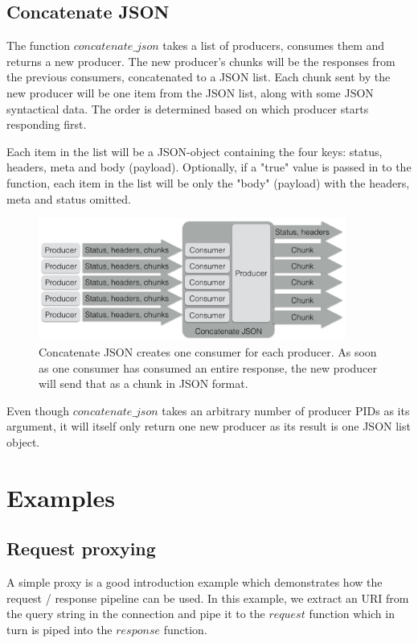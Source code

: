\documentclass{cslthse-msc}
\begin{document}
\subsection{Concatenate JSON}
The function $concatenate\_json$ takes a list of producers, consumes them and returns a new producer. The new producer's chunks will be the responses from the previous consumers, concatenated to a JSON list. Each chunk sent by the new producer will be one item from the JSON list, along with some JSON syntactical data. The order is determined based on which producer starts responding first.

Each item in the list will be a JSON-object containing the four keys: status, headers, meta and body (payload). Optionally, if a "true" value is passed in to the function, each item in the list will be only the "body" (payload) with the headers, meta and status omitted.


\begin{figure}[H]
  \centering
    \begin{center}
      \includegraphics[width=0.9\textwidth]{images/crocpear_concatenate_json.png}
    \end{center}
  \caption{Concatenate JSON creates one consumer for each producer. As soon as one consumer has consumed an entire response, the new producer will send that as a chunk in JSON format.}
\end{figure}

Even though $concatenate\_json$ takes an arbitrary number of producer PIDs as its argument, it will itself only return one new producer as its result is one JSON list object.

\section{Examples}
\subsection{Request proxying}
A simple proxy is a good introduction example which demonstrates how the request / response pipeline can be used. In this example, we extract an URI from the query string in the connection and pipe it to the $request$ function which in turn is piped into the $response$ function.
\end{document}
